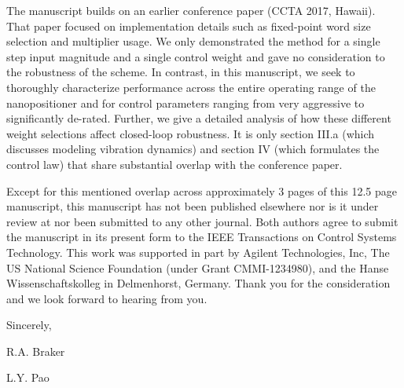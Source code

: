 \documentclass[a4paper,twoside]{article}
\begin{document}
The manuscript builds on an earlier conference paper (CCTA 2017, Hawaii). That paper focused on implementation details such as fixed-point word size selection and multiplier usage. We only demonstrated the method for a single step input magnitude and a single control weight and gave no consideration to the robustness of the scheme. In contrast, in this manuscript, we seek to thoroughly characterize performance across the entire operating range of the nanopositioner and for control parameters ranging from very aggressive to significantly de-rated. Further, we give a detailed analysis of how these different weight selections affect closed-loop robustness. It is only section III.a (which discusses modeling vibration dynamics) and section IV (which formulates the control law) that share substantial overlap with the conference paper.

Except for this mentioned overlap across approximately 3 pages of this 12.5 page manuscript, this manuscript has not been published elsewhere nor is it under review at nor been submitted to any other journal. Both authors agree to submit the manuscript in its present form to the IEEE Transactions on Control Systems Technology. This work was supported in part by Agilent Technologies, Inc, The US National Science Foundation (under Grant CMMI-1234980), and the Hanse Wissenschaftskolleg in Delmenhorst, Germany. Thank you for the consideration and we look forward to hearing from you.

\par\bigskip
\noindent Sincerely,
\par\bigskip
\noindent R.A. Braker\par
\noindent L.Y. Pao
\end{document}
